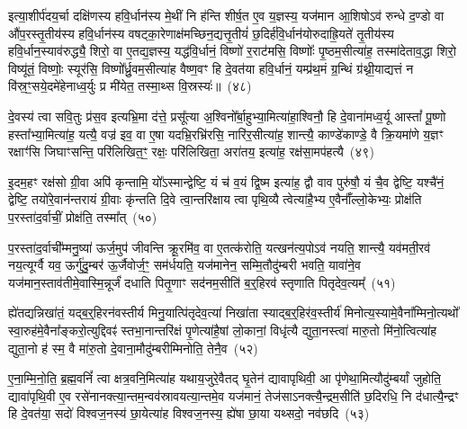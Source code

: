 इत्या॒शीर्प॑दय॒र्चा दक्षि॑णस्य हवि॒र्धान॑स्य मे॒थीं नि ह॑न्ति शीर्\mbox{}ष॒त ए॒व य॒ज्ञस्य॒ यज॑मान आ॒शिषो\-ऽव॑ रुन्धे द॒ण्डो वा औ॑प॒रस्तृ॒तीय॑स्य हवि॒र्धान॑स्य वषट्का॒रेणाक्ष॑मच्छिन॒द्यत्तृ॒तीयं॑ छ॒दिर्\mbox{}ह॑वि॒र्धान॑योरुदाह्रि॒यते॑ तृ॒तीय॑स्य हवि॒र्धान॒स्याव॑रुद्ध्यै॒ शिरो॒ वा ए॒तद्य॒ज्ञस्य॒ यद्ध॑वि॒र्धानं॒ विष्णो॑ र॒राट॑मसि॒ विष्णोः᳚ पृ॒ष्ठम॒सीत्या॑ह॒ तस्मा॑देताव॒द्धा शिरो॒ विष्यू॑तं॒ विष्णोः॒ स्यूर॑सि॒ विष्णो᳚र्ध्रु॒वम॒सीत्या॑ह वैष्ण॒वꣳ हि दे॒वत॑या हवि॒र्धानं॒ यम्प्र॑थ॒मं ग्र॒न्थिं ग्र॑थ्नी॒याद्यत्तं न वि॑स्र॒ꣳ॒सये॒दमे॑हेनाध्व॒र्युः प्र मी॑येत॒ तस्मा॒थ्स वि॒स्रस्यः॑॥~(४८)

{\anuvakamend[{पत्नी॑ हन्युर्वा पृथि॒व्या विष्यू॑तं॒ विष्णोः॒ षड्विꣳ॑शतिश्च}]}%

दे॒वस्य॑ त्वा सवि॒तुः प्र॑स॒व इत्यभ्रि॒मा द॑त्ते॒ प्रसू᳚त्या अ॒श्विनो᳚र्बा॒हुभ्या॒मित्या॑हा॒श्विनौ॒ हि दे॒वाना॑मध्व॒र्यू आस्तां᳚ पू॒ष्णो हस्ता᳚भ्या॒मित्या॑ह॒ यत्यै॒ वज्र॑ इव॒ वा ए॒षा यदभ्रि॒रभ्रि॑रसि॒ नारि॑र॒सीत्या॑ह॒ शान्त्यै॒ काण्डे॑काण्डे॒ वै क्रि॒यमा॑णे य॒ज्ञꣳ रक्षाꣳ॑सि जिघाꣳसन्ति॒ परि॑लिखित॒ꣳ॒ रक्षः॒ परि॑लिखिता॒ अरा॑तय॒ इत्या॑ह॒ रक्ष॑सा॒मप॑हत्यै~(४९)

इ॒दम॒हꣳ रक्ष॑सो ग्री॒वा अपि॑ कृन्तामि॒ यो᳚\-ऽस्मान्द्वेष्टि॒ यं च॑ व॒यं द्वि॒ष्म इत्या॑ह॒ द्वौ वाव पुरु॑षौ॒ यं चै॒व द्वेष्टि॒ यश्चै॑नं॒ द्वेष्टि॒ तयो॑रे॒वान॑न्तरायं ग्री॒वाः कृ॑न्तति दि॒वे त्वा॒न्तरि॑क्षाय त्वा पृथि॒व्यै त्वेत्या॑है॒भ्य ए॒वैनाँ᳚ल्लो॒केभ्यः॒ प्रोक्ष॑ति प॒रस्ता॑द॒र्वाचीं॒ प्रोक्ष॑ति॒ तस्मा᳚त्~(५०)

प॒रस्ता॑द॒र्वाची᳚म्मनु॒ष्या॑ ऊर्ज॒मुप॑ जीवन्ति क्रू॒रमि॑व॒ वा ए॒तत्क॑रोति॒ यत्खन॑त्य॒पो\-ऽव॑ नयति॒ शान्त्यै॒ यव॑मती॒रव॑ नय॒त्यूर्ग्वै यव॒ ऊर्गु॑दु॒म्बर॑ ऊ॒र्जैवोर्ज॒ꣳ॒ सम॑र्धयति॒ यज॑मानेन॒ सम्मि॒तौदु॑म्बरी भवति॒ यावा॑ने॒व यज॑मान॒स्ताव॑तीमे॒वास्मि॒न्नूर्जं॑ दधाति पितृ॒णाꣳ सद॑नम॒सीति॑ ब॒र्॒\mbox{}हिरव॑ स्तृणाति पितृदेव॒त्यम्᳚~(५१)

ह्ये॑तद्यन्निखा॑तं॒ यद्ब॒र्॒\mbox{}हिरन॑वस्तीर्य मिनु॒यात्पि॑तृदेव॒त्या॑ निखा॑ता स्याद्ब॒र्॒\mbox{}हिर॑व॒स्तीर्य॑ मिनोत्य॒स्यामे॒वैना᳚म्मिनो॒त्यथो᳚ स्वा॒रुह॑मे॒वैना᳚ङ्करो॒त्युद्दिवꣴ॑ स्तभा॒नान्तरि॑क्षं पृ॒णेत्या॑है॒षां लो॒कानां॒ विधृ॑त्यै द्युता॒नस्त्वा॑ मारु॒तो मि॑नो॒त्वित्या॑ह द्युता॒नो ह॑ स्म॒ वै मा॑रु॒तो दे॒वाना॒मौदु॑म्बरीम्मिनोति॒ तेनै॒व~(५२)

ए॒ना॒म्मि॒नो॒ति॒ ब्र॒ह्म॒वनिं᳚ त्वा क्षत्र॒वनि॒मित्या॑ह यथाय॒जुरे॒वैतद् घृ॒तेन॑ द्यावा\-पृथिवी॒ आ पृ॑णेथा॒मित्यौदु॑म्बर्यां जुहोति॒ द्यावा॑पृथि॒वी ए॒व रसे॑नानक्त्या॒न्तम॒न्वव॑स्रावयत्या॒न्तमे॒व यज॑मानं॒ तेज॑सा\-ऽनक्त्यै॒न्द्रम॒सीति॑ छ॒दिरधि॒ नि द॑धात्यै॒न्द्रꣳ हि दे॒वत॑या॒ सदो॑ विश्वज॒नस्य॑ छा॒येत्या॑ह विश्वज॒नस्य॒ ह्ये॑षा छा॒या यथ्सदो॒ नव॑छदि~(५३)

